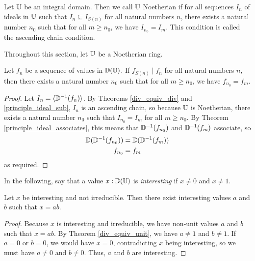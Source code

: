 \documentclass[../../math.tex]{subfiles}
\begin{document}
\begin{class}
    Let $\mathbb{U}$ be an integral domain.  Then we call $\mathbb{U}$ Noetherian if for all
    sequences $I_n$ of ideals in $\mathbb{U}$ such that $I_n \subseteq I_{S(n)}$ for all
    natural numbers $n$, there exists a natural number $n_0$ such that for all
    $m \geq n_0$, we have $I_{n_0} = I_m$.  This condition is called the
    ascending chain condition.
\end{class}

Throughout this section, let $\mathbb{U}$ be a Noetherian ring.

\begin{theorem} \label{noetherian_div}
    Let $f_n$ be a sequence of values in $\mathbb{D}(\mathbb{U})$.  If $f_{S(n)} \mid f_n$ for
    all natural numbers $n$, then there exists a natural number $n_0$ such that
    for all $m \geq n_0$, we have $f_{n_0} = f_m$.
\end{theorem}
\begin{proof}
    Let $I_n = \langle \mathbb{D}^{-1}(f_n) \rangle$.  By Theorems \ref{div_equiv_div}
    and \ref{principle_ideal_sub}, $I_n$ is an ascending chain, so because $\mathbb{U}$
    is Noetherian, there exists a natural number $n_0$ such that $I_{n_0} = I_m$
    for all $m \geq n_0$.  By Theorem \ref{principle_ideal_associates}, this
    means that $\mathbb{D}^{-1}(f_{n_0})$ and $\mathbb{D}^{-1}(f_m)$ associate, so
    \begin{align*}
        \mathbb{D}(\mathbb{D}^{-1}(f_{n_0})) &= \mathbb{D}(\mathbb{D}^{-1}(f_m)) \\
        f_{n_0} &= f_m
    \end{align*}
    as required.
\end{proof}

In the following, say that a value $x : \mathbb{D}(\mathbb{U})$ is \textit{interesting} if $x
\neq 0$ and $x \neq 1$.

\begin{lemma} \label{ring_factor_ex}
    Let $x$ be interesting and not irreducible.  Then there exist interesting
    values $a$ and $b$ such that $x = ab$.
\end{lemma}
\begin{proof}
    Because $x$ is interesting and irreducible, we have non-unit values $a$ and
    $b$ such that $x = ab$.  By Theorem \ref{div_equiv_unit}, we have $a \neq 1$
    and $b \neq 1$.  If $a = 0$ or $b = 0$, we would have $x = 0$, contradicting
    $x$ being interesting, so we must have $a \neq 0$ and $b \neq 0$.  Thus, $a$
    and $b$ are interesting.
\end{proof}
\end{document}
